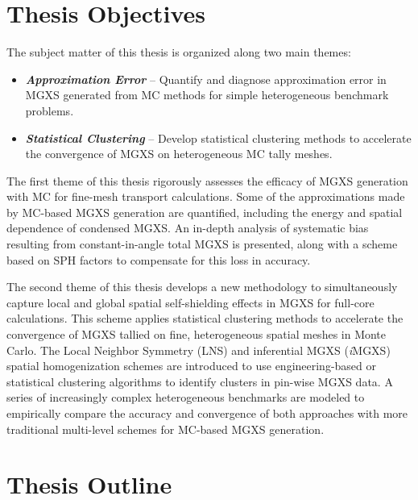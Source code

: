 \section{Thesis Objectives}
\label{sec:chap1-objectives}

The subject matter of this thesis is organized along two main themes:

\begin{itemize}
\item \textbf{\textit{Approximation Error}} -- Quantify and diagnose approximation error in \ac{MGXS} generated from \ac{MC} methods for simple heterogeneous benchmark problems.
\item \textbf{\textit{Statistical Clustering}} -- Develop statistical clustering methods to accelerate the convergence of \ac{MGXS} on heterogeneous \ac{MC} tally meshes.
\end{itemize}

The first theme of this thesis rigorously assesses the efficacy of \ac{MGXS} generation with \ac{MC} for fine-mesh transport calculations. Some of the approximations made by \ac{MC}-based \ac{MGXS} generation are quantified, including the energy and spatial dependence of condensed \ac{MGXS}. An in-depth analysis of systematic bias resulting from constant-in-angle total \ac{MGXS} is presented, along with a scheme based on \ac{SPH} factors to compensate for this loss in accuracy. 

The second theme of this thesis develops a new methodology to simultaneously capture local and global spatial self-shielding effects in \ac{MGXS} for full-core calculations. This scheme applies statistical clustering methods to accelerate the convergence of \ac{MGXS} tallied on fine, heterogeneous spatial meshes in Monte Carlo. The Local Neighbor Symmetry (LNS) and inferential \ac{MGXS} (\textit{i}\ac{MGXS}) spatial homogenization schemes are introduced to use engineering-based or statistical clustering algorithms to identify clusters in pin-wise \ac{MGXS} data. A series of increasingly complex heterogeneous benchmarks are modeled to empirically compare the accuracy and convergence of both approaches with more traditional multi-level schemes for \ac{MC}-based MGXS generation.


\section{Thesis Outline}
\label{sec:chap1-outline}

